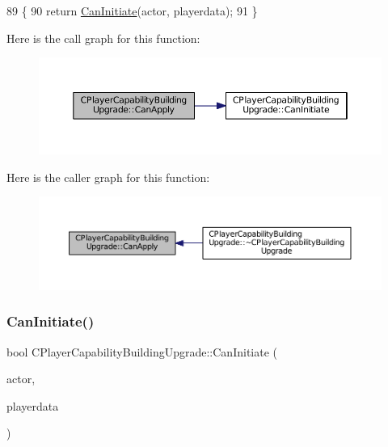 \begin{DoxyCode}
89                                                                                                            
                                                            \{
90     \textcolor{keywordflow}{return} \hyperlink{classCPlayerCapabilityBuildingUpgrade_af515cec6f1a28607864c853307e17d7c}{CanInitiate}(actor, playerdata);
91 \}
\end{DoxyCode}
Here is the call graph for this function\+:
\nopagebreak
\begin{figure}[H]
\begin{center}
\leavevmode
\includegraphics[width=350pt]{classCPlayerCapabilityBuildingUpgrade_a22de7902bcf6406a3b3a7c51e5c56f35_cgraph}
\end{center}
\end{figure}
Here is the caller graph for this function\+:
\nopagebreak
\begin{figure}[H]
\begin{center}
\leavevmode
\includegraphics[width=350pt]{classCPlayerCapabilityBuildingUpgrade_a22de7902bcf6406a3b3a7c51e5c56f35_icgraph}
\end{center}
\end{figure}
\hypertarget{classCPlayerCapabilityBuildingUpgrade_af515cec6f1a28607864c853307e17d7c}{}\label{classCPlayerCapabilityBuildingUpgrade_af515cec6f1a28607864c853307e17d7c} 
\subsubsection{\texorpdfstring{Can\+Initiate()}{CanInitiate()}}
{\footnotesize\ttfamily bool C\+Player\+Capability\+Building\+Upgrade\+::\+Can\+Initiate (\begin{DoxyParamCaption}\item[{std\+::shared\+\_\+ptr$<$ \hyperlink{classCPlayerAsset}{C\+Player\+Asset} $>$}]{actor,  }\item[{std\+::shared\+\_\+ptr$<$ \hyperlink{classCPlayerData}{C\+Player\+Data} $>$}]{playerdata }\end{DoxyParamCaption})\hspace{0.3cm}{\ttfamily [virtual]}}



